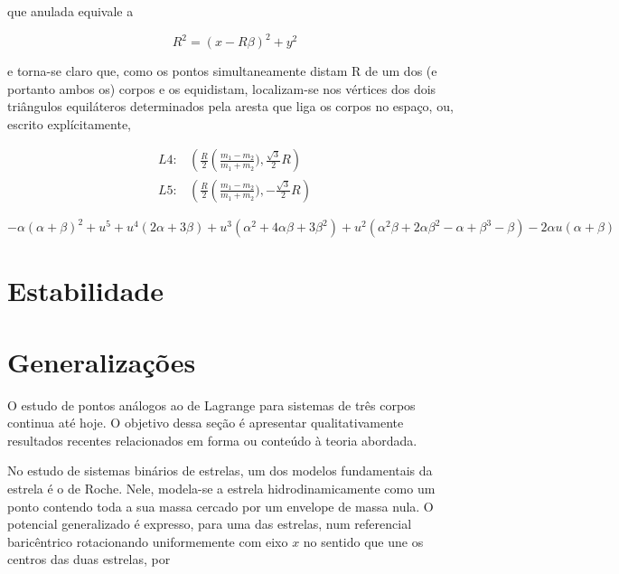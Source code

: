 que anulada equivale a

\begin{equation}
    R^2=(x-R\beta)^2+y^2
\end{equation}

e torna-se claro que, como os pontos simultaneamente distam R de um dos (e portanto ambos os) corpos e os equidistam, localizam-se nos vértices dos dois triângulos equiláteros determinados pela aresta que liga os corpos no espaço, ou, escrito explícitamente,

\begin{align}
    L4: & \left(\frac{R}{2}\left(\frac{m_1 - m_2}{m_1 + m_2}),\frac{\sqrt{3}}{2}R\right) \\
    L5: & \left(\frac{R}{2}\left(\frac{m_1 - m_2}{m_1 + m_2}),-\frac{\sqrt{3}}{2}R\right)
\end{align}

\begin{equation}
    -\alpha  (\alpha +\beta )^2+u^5+u^4 (2 \alpha +3 \beta )+u^3 \left(\alpha ^2+4 \alpha  \beta +3 \beta
   ^2\right)+u^2 \left(\alpha ^2 \beta +2 \alpha  \beta ^2-\alpha +\beta ^3-\beta \right)-2 \alpha  u
   (\alpha +\beta )
\end{equation}

\section{Estabilidade}

\section{Generalizações}

O estudo de pontos análogos ao de Lagrange para sistemas de três corpos continua até hoje. O objetivo dessa seção é apresentar qualitativamente resultados recentes relacionados em forma ou conteúdo à teoria abordada.

No estudo de sistemas binários de estrelas, um dos modelos fundamentais da estrela é o de Roche. Nele, modela-se a estrela hidrodinamicamente como um ponto contendo toda a sua massa cercado por um envelope de massa nula. O potencial generalizado é expresso, para uma das estrelas, num referencial baricêntrico rotacionando uniformemente com eixo $x$ no sentido que une os centros das duas estrelas, por

